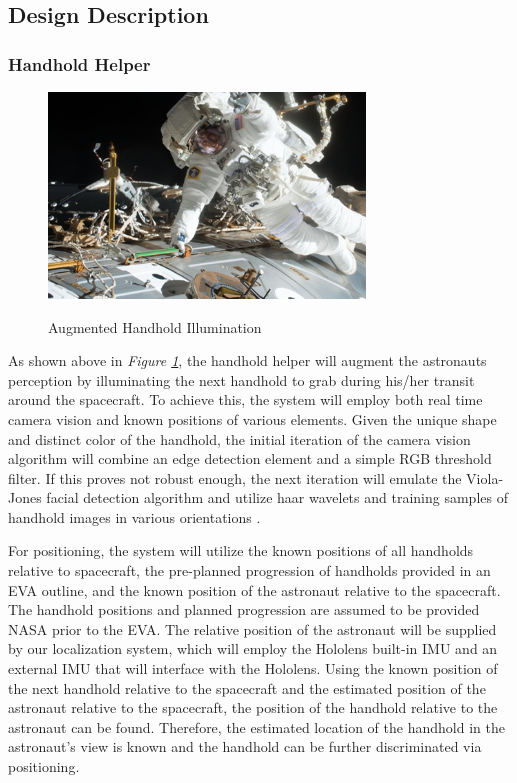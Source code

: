 \documentclass{article}
\let\Oldsubsection\subsection
\renewcommand{\subsection}{\FloatBarrier\Oldsubsection}
\let\Oldsubsubsection\subsubsection
\renewcommand{\subsubsection}{\FloatBarrier\Oldsubsubsection}
\begin{document}
\subsection{Design Description}

\subsubsection{Handhold Helper}

\begin{figure}[!htb]
  \centering
  \caption{Augmented Handhold Illumination}
  \includegraphics[width=0.75\textwidth]{assets/markedhandrail.png}
  \label{fig:markedhandrail}
\end{figure}

As shown above in \textit{Figure \ref{fig:markedhandrail}}, the handhold helper will augment the astronauts perception by illuminating the next handhold to grab during his/her transit around the spacecraft. To achieve this, the system will employ both real time camera vision and known positions of various elements. Given the unique shape and distinct color of the handhold, the initial iteration of the camera vision algorithm will combine an edge detection element and a simple RGB threshold filter. If this proves not robust enough, the next iteration will emulate the Viola-Jones facial detection algorithm and utilize haar wavelets and training samples of handhold images in various orientations \autocite{violajones}.

For positioning, the system will utilize the known positions of all handholds relative to spacecraft, the pre-planned progression of handholds provided in an EVA outline, and the known position of the astronaut relative to the spacecraft. The handhold positions and planned progression are assumed to be provided NASA prior to the EVA. The relative position of the astronaut will be supplied by our localization system, which will employ the Hololens built-in IMU and an external IMU that will interface with the Hololens. Using the known position of the next handhold relative to the spacecraft and the estimated position of the astronaut relative to the spacecraft, the position of the handhold relative to the astronaut can be found. Therefore, the estimated location of the handhold in the astronaut’s view is known and the handhold can be further discriminated via positioning.
\end{document}
